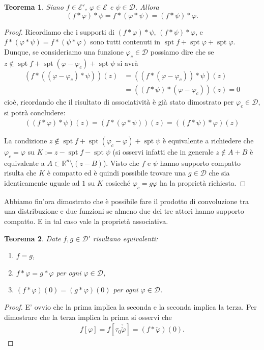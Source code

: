 \documentclass[italian,a4paper,oneside,headinclude]{scrbook}
\renewcommand{\phi}{\varphi}
\newcommand{\D}{\mathcal D}
\newcommand{\E}{\mathcal E}
\newcommand{\RR}{\mathbb R}
\newcommand{\defeq}{:=}
\DeclareMathOperator{\spt}{spt}
\newtheorem{theorem}{Teorema}
\begin{document}
\begin{theorem}
  Siano $f\in \E'$, $\phi\in \E$ e $\psi\in \D$. Allora
  \[
  (f*\phi)*\psi = f*(\phi * \psi) = (f*\psi)*\phi.
  \]
\end{theorem}
%
\begin{proof}
  Ricordiamo che i supporti di $(f*\phi)*\psi$,
  $(f*\psi)*\phi$,
  e $f*(\phi*\psi)=f*(\psi*\phi)$
  sono tutti contenuti in $\spt f + \spt \phi + \spt \phi$.
  Dunque, se consideriamo una funzione $\phi_c \in \D$ possiamo dire
  che se $z\not \in \spt f  + \spt (\phi-\phi_c) + \spt \psi$ si avrà
  \begin{align*}
    (f * ((\phi-\phi_c) * \psi ))(z)
    &= ((f*(\phi - \phi_c))*\psi)(z)\\
    &= ((f*\psi)*(\phi - \phi_c))(z)
    = 0
  \end{align*}
  cioè,
  ricordando che il risultato di associatività
  è già stato dimostrato per $\phi_c\in \D$,
  si potrà concludere:
  \begin{gather*}
    ((f*\phi)*\psi)(z) = (f * (\phi * \psi))(z) =  ((f*\psi)*\phi)(z)
  \end{gather*}

  La condizione $z\not \in \spt f + \spt(\phi_c - \phi) + \spt \psi$ è
  equivalente a richiedere che $\phi_c = \phi$ su
  $K\defeq z-\spt f -\spt \psi$ (si osservi infatti che in generale
  $z\not \in A+B$ è equivalente a $A\subset \RR^n\setminus(z-B)$).
  Visto che $f$ e $\psi$ hanno supporto compatto risulta che $K$ è
  compatto ed è quindi possibile trovare una $g\in \D$ che sia
  identicamente uguale ad $1$ su $K$ cosicché $\phi_c = g\phi$ ha la
  proprietà richiesta.
\end{proof}

Abbiamo fin'ora dimostrato che è possibile fare il prodotto di
convoluzione tra una distribuzione e due funzioni se almeno due dei
tre attori hanno supporto compatto. E in tal caso vale la proprietà
associativa.

\begin{theorem}\label{th:distrib_equivalence}
  Date $f,g \in \D'$ risultano equivalenti:
  \begin{enumerate}
  \item $f=g$,
  \item $f*\phi = g*\phi$ per ogni $\phi \in \D$,
  \item $(f*\phi)(0) = (g*\phi)(0)$ per ogni $\phi \in \D$.
  \end{enumerate}
\end{theorem}
%
\begin{proof}
  E' ovvio che la prima implica la seconda e la seconda implica la
  terza. Per dimostrare che la terza implica la prima si osservi che
  \begin{align*}
    f[\phi]
    = f[\tau_0 \check{\check \phi}]
    = (f*\check \phi)(0).
  \end{align*}
\end{proof}
\end{document}
